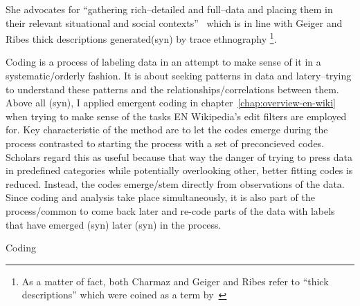 She advocates for ``gathering rich–detailed and full–data and placing them in their relevant situational and social contexts''~\cite[p.10-11]{Charmaz2006} which is in line with Geiger and Ribes thick descriptions generated(syn) by trace ethnography
\footnote{As a matter of fact, both Charmaz and Geiger and Ribes refer to ``thick descriptions'' which were coined as a term by~\cite{Geertz1973}}.

Coding is a process of labeling data in an attempt to make sense of it in a systematic/orderly fashion.
It is about seeking patterns in data and latery–trying to understand these patterns and the relationships/correlations between them.
Above all (syn), I applied emergent coding in chapter~\ref{chap:overview-en-wiki} when trying to make sense of the tasks EN Wikipedia's edit filters are employed for.
Key characteristic of the method are to let the codes emerge during the process contrasted to starting the process with a set of preconcieved codes.
Scholars regard this as useful because that way the danger of trying to press data in predefined categories while potentially overlooking other, better fitting codes is reduced.
Instead, the codes emerge/stem directly from observations of the data.
Since coding and analysis take place simultaneously, it is also part of the process/common to come back later and re-code parts of the data with labels that have emerged (syn) later (syn) in the process.

Coding~\cite[42-71]{Charmaz2006}


